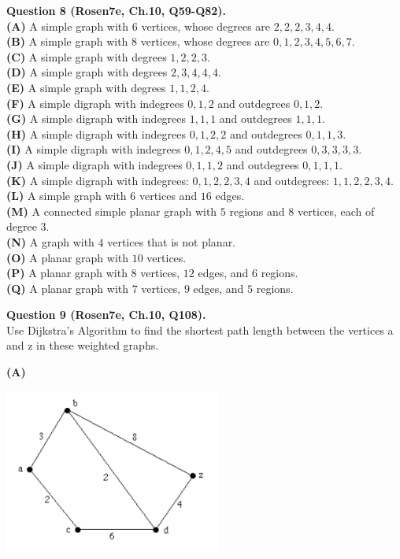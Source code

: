 \documentclass[jou]{apa6}
\begin{document}
\vspace{10pt}
{\bf Question 8 (Rosen7e, Ch.10, Q59-Q82).}\\
{\bf (A)} A simple graph with $6$ vertices, whose degrees are $2,2,2,3,4,4$.\\
{\bf (B)} A simple graph with $8$ vertices, whose degrees are $0,1,2,3,4,5,6,7$.\\
{\bf (C)} A simple graph with degrees $1,2,2,3$.\\
{\bf (D)} A simple graph with degrees $2,3,4,4,4$.\\
{\bf (E)} A simple graph with degrees $1,1,2,4$.\\
{\bf (F)} A simple digraph with indegrees $0,1,2$ and outdegrees $0,1,2$.\\
{\bf (G)} A simple digraph with indegrees $1,1,1$ and outdegrees $1,1,1$.\\
{\bf (H)} A simple digraph with indegrees $0,1,2,2$ and outdegrees $0,1,1,3$.\\
{\bf (I)} A simple digraph with indegrees $0,1,2,4,5$ and outdegrees $0,3,3,3,3$.\\
{\bf (J)} A simple digraph with indegrees $0,1,1,2$ and outdegrees $0,1,1,1$.\\
{\bf (K)} A simple digraph with indegrees: $0,1,2,2,3,4$ and outdegrees: $1,1,2,2,3,4$.\\
{\bf (L)} A simple graph with $6$ vertices and $16$ edges.\\
{\bf (M)} A connected simple planar graph with $5$ regions and $8$ vertices, each of degree $3$.\\
{\bf (N)} A graph with $4$ vertices that is not planar.\\
{\bf (O)} A planar graph with $10$ vertices.\\
{\bf (P)} A planar graph with $8$ vertices, $12$ edges, and $6$ regions.\\
{\bf (Q)} A planar graph with $7$ vertices, $9$ edges, and $5$ regions.



\vspace{10pt}
{\bf Question 9 (Rosen7e, Ch.10, Q108).}\\
Use Dijkstra’s Algorithm to find the shortest path length between 
the vertices a and z in these weighted graphs.

{\bf (A)}
\begin{center}
\includegraphics[width=2.8in]{dijkstra-graph1.png}
\end{center}
\end{document}
